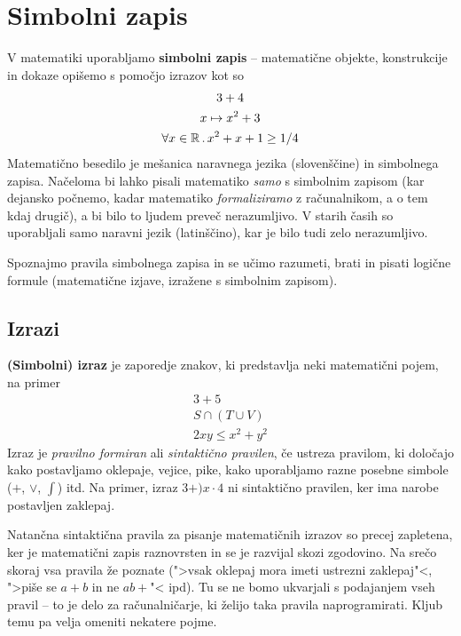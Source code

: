 \chapter{Simbolni zapis}

V matematiki uporabljamo \textbf{simbolni zapis} -- matematične objekte, konstrukcije in dokaze opišemo s pomočjo izrazov kot so
%
\begin{gather*}
  3 + 4\\
  x \mapsto x^2 + 3\\
  \forall x \in \mathbb{R} \,.\, x^2 + x + 1 \geq 1/4
\end{gather*}
%
Matematično besedilo je mešanica naravnega jezika (slovenščine) in simbolnega zapisa. Načeloma bi lahko pisali matematiko \emph{samo} s simbolnim zapisom (kar dejansko počnemo, kadar matematiko \emph{formaliziramo} z računalnikom, a o tem kdaj drugič), a bi bilo to ljudem preveč nerazumljivo. V starih časih so uporabljali samo naravni jezik (latinščino), kar je bilo tudi zelo nerazumljivo.

Spoznajmo pravila simbolnega zapisa in se učimo razumeti, brati in pisati logične formule (matematične izjave, izražene s simbolnim zapisom).


\section{Izrazi}

\textbf{(Simbolni) izraz} je zaporedje znakov, ki predstavlja neki matematični pojem, na primer
%
\begin{gather*}
  3 + 5 \\
  S \cap (T \cup V) \\
  2 x y \leq x^2 + y^2
\end{gather*}
%
Izraz je \emph{pravilno formiran} ali \emph{sintaktično pravilen}, če ustreza pravilom, ki določajo kako postavljamo oklepaje,
vejice, pike, kako uporabljamo razne posebne simbole ($+$, $\lor$, $\int$) itd. Na primer, izraz $3 + ) x \cdot 4$ ni sintaktično
pravilen, ker ima narobe postavljen zaklepaj.

Natančna sintaktična pravila za pisanje matematičnih izrazov so precej zapletena, ker je matematični zapis raznovrsten
in se je razvijal skozi zgodovino. Na srečo skoraj vsa pravila že poznate (">vsak oklepaj mora imeti ustrezni zaklepaj"<,
">piše se $a + b$ in ne $a b +$"< ipd). Tu se ne bomo ukvarjali s podajanjem vseh pravil -- to je delo za računalničarje,
ki želijo taka pravila naprogramirati. Kljub temu pa velja omeniti nekatere pojme.


